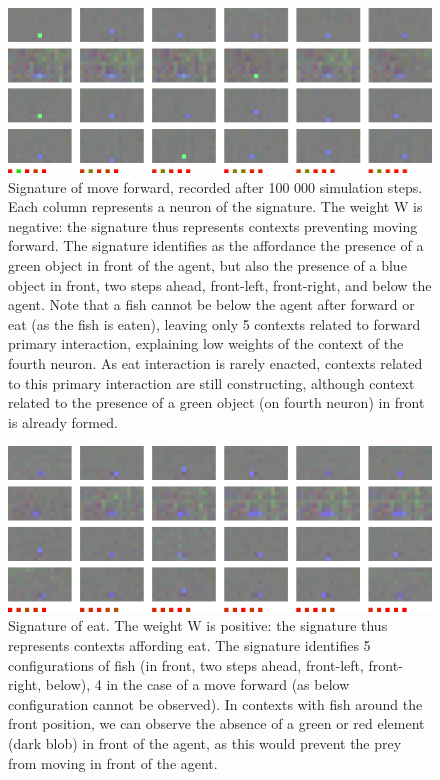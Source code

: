 \documentclass[conference]{IEEEtran}
\begin{document}
\begin{figure}[htbp]
\centerline{\includegraphics[scale=0.35]{img/sig_forward.png}}
\caption{Signature of move forward, recorded after 100 000 simulation steps. Each column represents a neuron of the signature. The weight W is negative: the signature thus represents contexts preventing moving forward. The signature identifies as the affordance the presence of a green object in front of the agent, but also the presence of a blue object in front, two steps ahead, front-left, front-right, and below the agent. Note that a fish cannot be below the agent after forward or eat (as the fish is eaten), leaving only 5 contexts related to forward primary interaction, explaining low weights of the context of the fourth neuron. As eat interaction is rarely enacted, contexts related to this primary interaction are still constructing, although context related to the presence of a green object (on fourth neuron) in front is already formed.}
\label{fig}
\end{figure}

\begin{figure}[htbp]
\centerline{\includegraphics[scale=0.35]{img/sig_eat.png}}
\caption{Signature of eat. The weight W is positive: the signature thus represents contexts affording eat. The signature identifies 5 configurations of fish (in front, two steps ahead, front-left, front-right, below), 4 in the case of a move forward (as below configuration cannot be observed). In contexts with fish around the front position, we can observe the absence of a green or red element (dark blob) in front of the agent, as this would prevent the prey from moving in front of the agent.}
\label{fig}
\end{figure}
\end{document}
